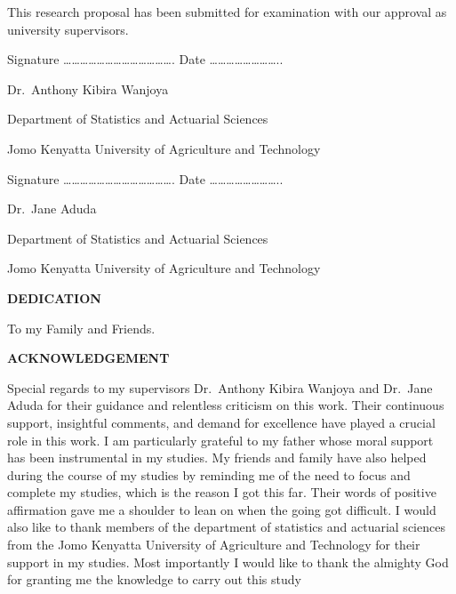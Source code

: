 \documentclass[
  12pt,
]{report}
\begin{document}
This research proposal has been submitted for examination with our
approval as university supervisors.

Signature
\ldots\ldots\ldots\ldots\ldots\ldots\ldots\ldots\ldots\ldots\ldots\ldots\ldots.
Date \ldots\ldots\ldots\ldots\ldots\ldots\ldots\ldots..

Dr.~Anthony Kibira Wanjoya

Department of Statistics and Actuarial Sciences

Jomo Kenyatta University of Agriculture and Technology

Signature
\ldots\ldots\ldots\ldots\ldots\ldots\ldots\ldots\ldots\ldots\ldots\ldots\ldots.
Date \ldots\ldots\ldots\ldots\ldots\ldots\ldots\ldots..

Dr.~Jane Aduda

Department of Statistics and Actuarial Sciences

Jomo Kenyatta University of Agriculture and Technology

\newpage

\begin{centering}

{\bf DEDICATION}

\end{centering}
\normalsize

To my Family and Friends.

\newpage

\begin{centering}

{\bf ACKNOWLEDGEMENT}

\end{centering}
\normalsize

Special regards to my supervisors Dr.~Anthony Kibira Wanjoya and
Dr.~Jane Aduda for their guidance and relentless criticism on this work.
Their continuous support, insightful comments, and demand for excellence
have played a crucial role in this work. I am particularly grateful to
my father whose moral support has been instrumental in my studies. My
friends and family have also helped during the course of my studies by
reminding me of the need to focus and complete my studies, which is the
reason I got this far. Their words of positive affirmation gave me a
shoulder to lean on when the going got difficult. I would also like to
thank members of the department of statistics and actuarial sciences
from the Jomo Kenyatta University of Agriculture and Technology for
their support in my studies. Most importantly I would like to thank the
almighty God for granting me the knowledge to carry out this study
\end{document}
